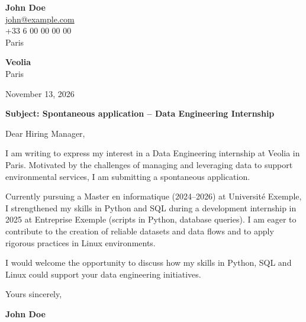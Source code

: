 \documentclass[11pt,a4paper]{article}
\begin{document}
{\Large\bfseries John Doe}\\[0.3cm]


\href{mailto:john@example.com}{john@example.com}\\



+33 6 00 00 00 00\\



Paris\\


\vspace{1cm}

\begin{flushright}

\textbf{Veolia}\\



Paris\\


\vspace{0.5cm}

November 13, 2026

\end{flushright}

\vspace{0.8cm}

\textbf{Subject: Spontaneous application – Data Engineering Internship}

\vspace{0.6cm}


Dear Hiring Manager,


\vspace{0.5cm}

\justifying


I am writing to express my interest in a Data Engineering internship at Veolia in Paris. Motivated by the challenges of managing and leveraging data to support environmental services, I am submitting a spontaneous application.

\par

Currently pursuing a Master en informatique (2024–2026) at Université Exemple, I strengthened my skills in Python and SQL during a development internship in 2025 at Entreprise Exemple (scripts in Python, database queries). I am eager to contribute to the creation of reliable datasets and data flows and to apply rigorous practices in Linux environments.

\par

I would welcome the opportunity to discuss how my skills in Python, SQL and Linux could support your data engineering initiatives.

\par


\vspace{0.7cm}


Yours sincerely,


\vspace{0.5cm}

\textbf{John Doe}
\end{document}
